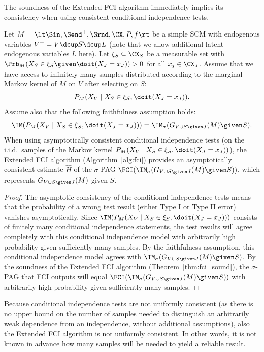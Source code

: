 The soundness of the Extended FCI algorithm immediately implies its consistency when using consistent conditional independence tests.
\begin{Cor}\label{cor:fci_consistent}
  Let $M = \lt \Sin, \Send^+, \Srnd, \CX, P, f \rt$ be a simple SCM with endogenous variables $V^+ = V \dcup S \dcup L$ (note that we allow additional latent endogenous variables $L$ here).
  Let $\xi_S \subseteq \CX_S$ be a measurable set with $\Prb_M(X_S \in \xi_S \given \doit(X_J = x_J)) > 0$ for all $x_j \in \CX_J$.
  Assume that we have access to infinitely many samples distributed according to the marginal Markov kernel of $M$ on $V$ after selecting on $S$:
    $$P_M(X_V \mid X_S \in \xi_S, \doit(X_J=x_J)).$$
  Assume also that the following faithfulness assumption holds:
    $$\IM(P_{M}(X_V \mid X_S \in \xi_S, \doit(X_J=x_J))) = \IM_\sigma(G_{V \cup S \given J}(M) \given S).$$
  When using asymptotically consistent conditional independence tests (on the i.i.d.\ samples of the Markov kernel $P_M(X_V \mid X_S \in \xi_S, \doit(X_J=x_J))$), 
  the Extended FCI algorithm (Algorithm~\ref{alg:fci}) provides an asymptotically consistent estimate $\hat{H}$ of the $\sigma$-PAG $\FCI(\IM_\sigma(G_{V \cup S \given J}(M) \given S))$, which represents $G_{V \cup S \given J}(M)$ given $S$.
\end{Cor}
\begin{proof}
  The asymptotic consistency of the conditional independence tests means that the probability of a wrong test result (either Type I or Type II error) vanishes asymptotically.
  Since $\IM(P_{M}(X_V \mid X_S \in \xi_S, \doit(X_J=x_J)))$ consists of finitely many conditional independence statements, the test results will agree completely with this conditional independence model with arbitrarily high probability given sufficiently many samples.
  By the faithfulness assumption, this conditional independence model agrees with $\IM_\sigma(G_{V \cup S \given J}(M) \given S)$.
  By the soundness of the Extended FCI algorithm (Theorem~\ref{thm:fci_sound}), the $\sigma$-PAG that FCI outputs will equal $\FCI(\IM_\sigma(G_{V \cup S \given J}(M) \given S))$ with arbitrarily high probability given sufficiently many samples.
\end{proof}
Because conditional independence tests are not uniformly consistent (as there is no upper bound on the number of samples needed to distinguish an arbitrarily weak dependence from an independence, without additional assumptions), also the Extended FCI algorithm is not uniformly consistent. 
In other words, it is not known in advance how many samples will be needed to yield a reliable result.


